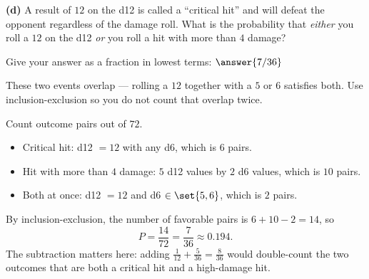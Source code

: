 \documentclass[12pt]{ximera}
\begin{document}
\begin{problem}
\begin{prompt}
\textbf{(d)} A result of $12$ on the d12 is called a ``critical hit'' and will defeat
the opponent regardless of the damage roll. What is the probability that \emph{either}
you roll a $12$ on the d12 \emph{or} you roll a hit with more than $4$ damage?

Give your answer as a fraction in lowest terms: $\answer{7/36}$

\begin{hint}
These two events overlap --- rolling a $12$ together with a $5$ or $6$ satisfies both.
Use inclusion-exclusion so you do not count that overlap twice.
\end{hint}

\begin{feedback}
Count outcome pairs out of $72$.
\begin{itemize}
\item Critical hit: d12 $=12$ with any d6, which is $6$ pairs.
\item Hit with more than $4$ damage: $5$ d12 values by $2$ d6 values, which is $10$ pairs.
\item Both at once: d12 $=12$ and d6 $\in\set{5,6}$, which is $2$ pairs.
\end{itemize}
By inclusion-exclusion, the number of favorable pairs is $6+10-2=14$, so
\[
P = \frac{14}{72} = \frac{7}{36}\approx 0.194.
\]
The subtraction matters here: adding $\frac{1}{12}+\frac{5}{36}=\frac{8}{36}$ would
double-count the two outcomes that are both a critical hit and a high-damage hit.
\end{feedback}
\end{prompt}
\end{problem}
\end{document}
